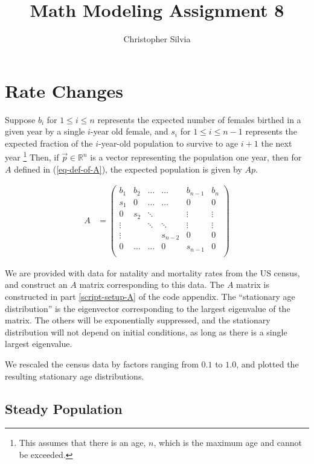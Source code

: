\documentclass{article}
\begin{document}
\title{Math Modeling Assignment 8}
\author{Christopher Silvia}
\maketitle

\section{Rate Changes}

Suppose $b_i$ for $1 \leq i \leq n$ represents the expected number of 
	females birthed in a given year by a single $i$-year old female,
	and $s_i$ for $1 \leq i \leq n-1$ represents the expected fraction 
	of the $i$-year-old	population to survive to age $i+1$ the next year
	\footnote{This assumes that there is an age, $n$, which is the
		maximum age and cannot be exceeded.}
Then, if $\vec{p} \in \mathbb{R}^n$ is a vector representing the population
	one year, then for $A$ defined in (\ref{eq-def-of-A}), the
	expected population is given by $A p$.

\begin{align}
A & =  \left( \begin{matrix}
	b_1 & b_2 & \dots & \dots & b_{n-1} & b_n \\
	s_1 & 0   & \dots & \dots & 0 & 0 \\
	0 & s_2 & \ddots & & \vdots & \vdots \\
	\vdots & & \ddots & \ddots & \vdots & \vdots \\
	\vdots & & & s_{n-2} & 0 & 0 \\
	0 & \dots & \dots & 0 & s_{n-1} & 0 \\
\end{matrix} \right) \label{eq-def-of-A}
\end{align}

We are provided with data for natality and mortality rates from the US census,
	and construct an $A$ matrix corresponding to this data.
The $A$ matrix is constructed in part \ref{script-setup-A} of the code appendix.
The ``stationary age distribution'' is the eigenvector corresponding
	to the largest eigenvalue of the matrix.
The others will be exponentially suppressed, and the stationary distribution
	will not depend on initial conditions, as long as there is a single largest
	eigenvalue.

We rescaled the census data by factors ranging from $0.1$ to $1.0$, and plotted
	the resulting stationary age distributions.

\subsection{Steady Population}
\end{document}
